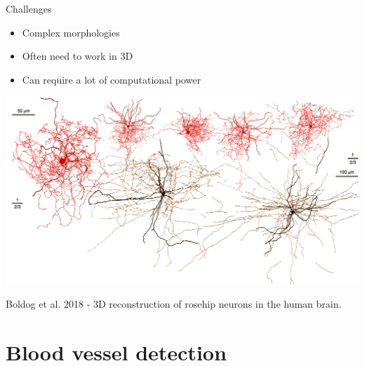\documentclass[9pt, aspectratio=169]{beamer}
\begin{document}
\begin{frame}
    {Challenges}
    \begin{itemize}
        \item Complex morphologies
        \item Often need to work in 3D
        \item Can require a lot of computational power
    \end{itemize}
    \centering
    \includegraphics[width=.6\textwidth]{Boldog2018-neurons.png}

    \footnotesize
    Boldog et al. 2018 - 3D reconstruction of rosehip neurons in the human brain.

\end{frame}

\section{Blood vessel detection}
\end{document}
